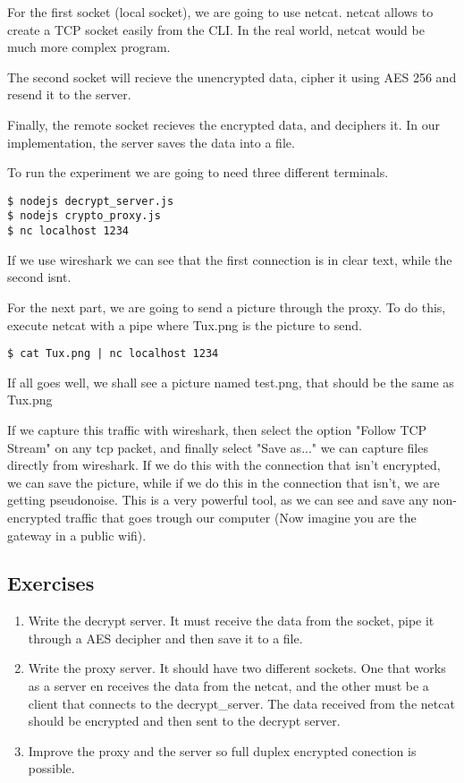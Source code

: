 For the first socket (local socket), we are going to use netcat. netcat allows to create a TCP socket easily from the CLI. In the real world, netcat would be much more complex program.

The second socket will recieve the unencrypted data, cipher it using AES 256 and resend it to the server.

Finally, the remote socket recieves the encrypted data, and deciphers it. In our implementation, the server saves the data into a file.

To run the experiment we are going to need three different terminals.

\begin{lstlisting}
$ nodejs decrypt_server.js
$ nodejs crypto_proxy.js
$ nc localhost 1234
\end{lstlisting}


If we use wireshark we can see that the first connection is in clear text, while the second isnt.

For the next part, we are going to send a picture through the proxy. To do this, execute netcat with a pipe where Tux.png is the picture to send.

\begin{lstlisting}
$ cat Tux.png | nc localhost 1234
\end{lstlisting}

If all goes well, we shall see a picture named test.png, that should be the same as Tux.png

If we capture this traffic with wireshark, then select the option "Follow TCP Stream" on any tcp packet, and finally select "Save as..." we can capture files directly from wireshark. If we do this with the connection that isn't encrypted, we can save the picture, while if we do this in the connection that isn't, we are getting pseudonoise. This is a very powerful tool, as we can see and save any non-encrypted traffic that goes trough our computer (Now imagine you are the gateway in a public wifi).

\subsection{Exercises}
\begin{enumerate}
	\item Write the decrypt server. It must receive the data from the socket, pipe it through a AES decipher and then save it to a file.
	
	\item Write the proxy server. It should have two different sockets. One that works as a server en receives the data from the netcat, and the other must be a client that connects to the decrypt\_server. The data received from the netcat should be encrypted and then sent to the decrypt server.
	
	\item Improve the proxy and the server so full duplex encrypted conection is possible.
\end{enumerate}

